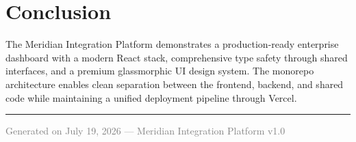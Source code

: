 \documentclass[12pt,a4paper]{article}
\begin{document}
\section{Conclusion}

The Meridian Integration Platform demonstrates a production-ready enterprise dashboard with a modern React stack, comprehensive type safety through shared interfaces, and a premium glassmorphic UI design system. The monorepo architecture enables clean separation between the frontend, backend, and shared code while maintaining a unified deployment pipeline through Vercel.

\vspace{1cm}
\noindent\rule{\textwidth}{0.4pt}
\begin{center}
\textcolor{gray}{\small Generated on July 19, 2026 --- Meridian Integration Platform v1.0}
\end{center}
\end{document}
